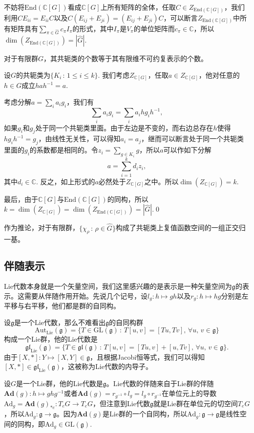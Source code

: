\documentclass[9pt]{extarticle}
\newcommand{\cc}{\mathbb{C}}
\newcommand{\lag}{{\mathfrak{g}}}
\begin{document}
不妨将$\mathrm{End}(\cc [G])$看成$\cc [G]$上所有矩阵的全体，任取$C\in Z_{\mathrm{End}(\cc [G])}$，我们利用$CE_{ii}=E_{ii}C$以及$C(E_{ij}+E_{ji})=(E_{ij}+E_{ji})C$，可以断言$Z_{\mathrm{End}(\cc [G])}$中所有矩阵具有$\sum_{\pi\in \hat{G}}c_\pi I_\pi$的形式，其中$I_\pi$是$V_\pi$的单位矩阵而$c_\pi\in\cc$，所以$\dim (Z_{\mathrm{End}(\cc [G])})=|\hat{G}|$.

\theo 对于有限群$G$，其共轭类的个数等于其有限维不可约复表示的个数。

\proof 设$G$的共轭类为$\{K_i\,:\, 1\leq i\leq k\}$. 我们考虑$Z_{\cc [G]}$，任取$a\in Z_{\cc [G]}$，他对任意的$h\in G$成立$hah^{-1}=a$. 

考虑分解$a=\sum_i a_ig_i$，我们有
\[
	\sum_i a_ig_i=\sum_i a_ihg_ih^{-1},
\]
如果$g_i$和$g_j$处于同一个共轭类里面。由于左边是不变的，而右边总存在$h$使得$hg_ih^{-1}=g_j$，由线性无关性，可以得知$a_i=a_j$，继而可以断言处于同一个共轭类里面的$g_i$的系数都是相同的。令$z_i=\sum_{g\in K_i}g$，所以$a$可以作如下分解
\[
	a=\sum_{i=1}^kd_iz_i,
\]
其中$d_i\in \cc$. 反之，如上形式的$a$必然处于$Z_{\cc [G]}$之中。所以$\dim (Z_{\cc [G]})=k$.

最后，由于$\cc [G]$与$\mathrm{End}(\cc [G])$的同构，所以$k=\dim (Z_{\cc [G]})=\dim (Z_{\mathrm{End}(\cc [G])})=|\hat{G}|$.\qed

\para 作为推论，对于有限群，$\{\chi_\rho\,:\, \rho\in \hat{G}\}$构成了共轭类上复值函数空间的一组正交归一基。

\subsection*{伴随表示}

Lie代数本身就是一个矢量空间，我们这里感兴趣的是表示是一种矢量空间为$\lag$的表示。这需要从伴随作用开始。先说几个记号，设$l_g:h\mapsto gh$以及$r_g:h\mapsto hg$分别是左平移与右平移，他们都是群的自同构。

\para 设$\lag$是一个Lie代数，那么不难看出$\lag$的自同构群
\[\mathrm{Aut}_{\mathrm{Lie}}(\lag)=\{T\in \mathrm{GL}(\lag)\,:\,T[u,v]=[Tu,Tv],\,\forall u,\,v\in\lag\}\]
构成一个Lie群，他的Lie代数是
\[\mathfrak{gl}_{\mathrm{Lie}}(\lag)=\{T\in \mathfrak{gl}(\lag)\,:\,T[u,v]=[Tu,v]+[u,Tv],\,\forall u,\,v\in\lag\}.\]
由于$[X,*]:Y\mapsto [X,Y]\in \lag$，且根据Jacobi恒等式，我们可以得知$[X,*]\in \mathfrak{gl}_{\mathrm{Lie}}(\lag)$，这被称为Lie代数的内导子。

\para 设$G$是一个Lie群，他的Lie代数是$\lag$。Lie代数的伴随来自于Lie群的伴随$\mathbf{Ad}(g):h\mapsto ghg^{-1}$或者$\mathbf{Ad}(g)=r_{g^{-1}}\circ l_g=l_g\circ r_{g^{-1}}$在单位元上的导数$\mathrm{Ad}_g=\mathbf{Ad}(g)_{*e}:T_eG\to T_eG$，但注意到Lie代数$\lag$就是Lie群在单位元的切空间$T_eG$，所以$\mathrm{Ad}_g:\lag\to \lag$。因为$\mathbf{Ad}(g)$是Lie群的一个自同构，所以$\mathrm{Ad}_g:\lag\to\lag$是线性空间的同构，即$\mathrm{Ad}_g\in \mathrm{GL}(\lag)$.
\end{document}
